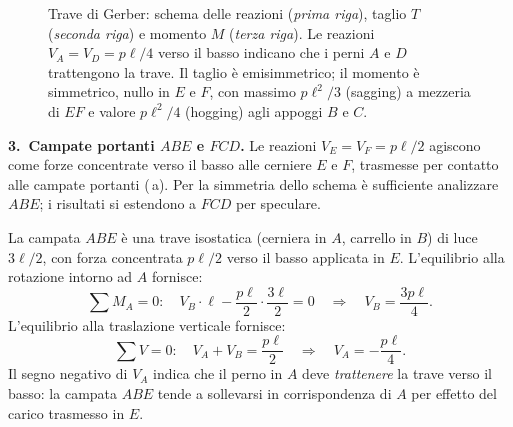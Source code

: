 \begin{figure}[htbp]
{
}%
\caption{Trave di Gerber: schema delle reazioni (\emph{prima riga}),
	taglio $T$ (\emph{seconda riga}) e momento $M$ (\emph{terza riga}).
	Le reazioni $V_A=V_D=p\ell/4$ verso il basso indicano che i perni $A$ e $D$
	trattengono la trave. Il taglio è emisimmetrico; il momento è simmetrico,
	nullo in $E$ e $F$, con massimo $p\ell^2/3$ (sagging) a mezzeria di $EF$
	e valore $p\ell^2/4$ (hogging) agli appoggi $B$ e $C$.}
\label{fig:gerber_esempio_diagrammi}
\end{figure}

\medskip
\noindent\textbf{3.~Campate portanti $ABE$ e $FCD$.}
Le reazioni $V_E = V_F = p\ell/2$ agiscono come forze concentrate
verso il basso alle cerniere $E$ e $F$, trasmesse per contatto
alle campate portanti (\,a). Per la simmetria dello schema è sufficiente
analizzare $ABE$; i risultati si estendono a $FCD$ per speculare.

La campata $ABE$ è una trave isostatica (cerniera in $A$, carrello
in $B$) di luce $3\ell/2$, con forza concentrata $p\ell/2$ verso il
basso applicata in $E$. L'equilibrio alla rotazione intorno ad $A$ fornisce:
\[
\sum M_A = 0\colon \quad
V_B \cdot \ell - \frac{p\ell}{2} \cdot \frac{3\ell}{2} = 0
\quad\Longrightarrow\quad
V_B = \frac{3p\ell}{4}.
\]
L'equilibrio alla traslazione verticale fornisce:
\[
\sum V = 0\colon \quad
V_A + V_B = \frac{p\ell}{2}
\quad\Longrightarrow\quad
V_A = -\frac{p\ell}{4}.
\]
Il segno negativo di $V_A$ indica che il perno in $A$ deve
\emph{trattenere} la trave verso il basso: la campata $ABE$ tende
a sollevarsi in corrispondenza di $A$ per effetto del carico
trasmesso in $E$.

